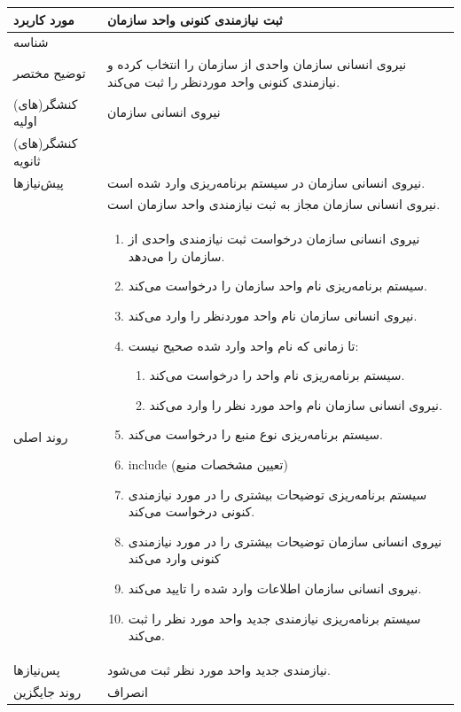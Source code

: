 \begin{table}[H]
	\centering
	\begin{tabular}{|p{3cm}|p{10cm}|}
		\hline
		
		مورد کاربرد	& ثبت نیازمندی کنونی واحد سازمان  \\
		\hline
		
		شناسه & 
		\stepcounter{usecase_ID}
		
		\arabic{usecase_ID} \\
		
		\hline
		
		توضیح مختصر & نیروی انسانی سازمان واحدی از سازمان را انتخاب کرده و نیازمندی کنونی واحد موردنظر را ثبت می‌کند. \\
		\hline
		
		کنشگر(های) اولیه& نیروی انسانی سازمان  \\
		\hline
		
		کنشگر(های) ثانویه&  \\
		\hline
		
		پیش‌نیازها &
		نیروی انسانی سازمان در سیستم برنامه‌ریزی وارد شده است.\\
		& نیروی انسانی سازمان مجاز به ثبت نیازمندی واحد سازمان است. \\
		\hline
		
		روند اصلی &
		\begin{enumerate}[topsep=0cm,leftmargin=0.5cm]
			\item نیروی انسانی سازمان درخواست ثبت نیازمندی‌ واحدی از سازمان را می‌دهد.
			\item سیستم برنامه‌ریزی نام واحد سازمان را درخواست می‌کند.
			\item نیروی انسانی سازمان نام واحد موردنظر را وارد می‌کند.
			\item تا زمانی که نام واحد وارد شده صحیح نیست: 
			\begin{enumerate}[topsep=0cm,leftmargin=0.5cm]
				\item سیستم برنامه‌ریزی نام واحد را درخواست می‌کند. 
				\item نیروی انسانی سازمان نام واحد مورد نظر را وارد می‌کند. 
			\end{enumerate}
			\item سیستم برنامه‌ریزی نوع منبع را درخواست می‌کند.
			\item include (تعیین مشخصات منبع)
			\item سیستم برنامه‌ریزی توضیحات بیشتری را در مورد نیازمندی کنونی درخواست می‌کند.
			\item نیروی انسانی سازمان توضیحات بیشتری را در مورد نیازمندی کنونی وارد می‌کند
			\item نیروی انسانی سازمان اطلاعات وارد شده را تایید می‌کند.
			\item سیستم برنامه‌ریزی نیازمندی‌ جدید واحد مورد نظر را ثبت می‌کند.
		\end{enumerate} \\
		\hline
		
		پس‌نیازها &
		نیازمندی جدید واحد مورد نظر ثبت می‌شود. \\		
		\hline
		روند جایگزین
		& انصراف \\
		\hline
		
	\end{tabular}
\end{table}

